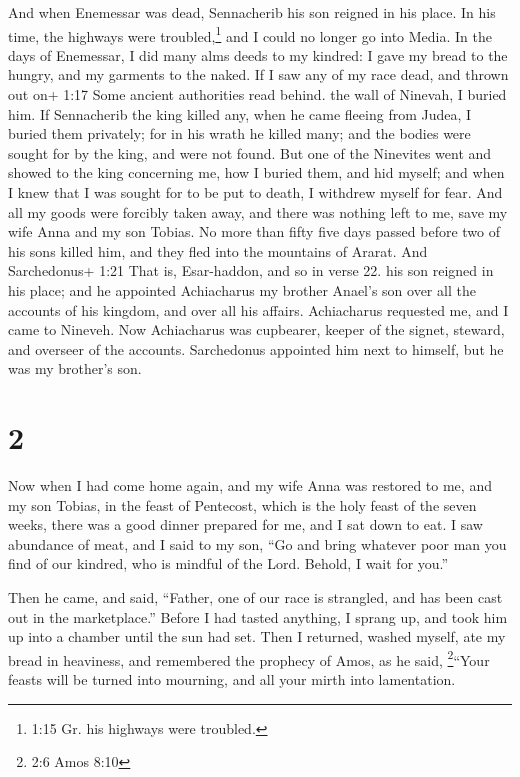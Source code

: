  And when Enemessar was dead, Sennacherib his son reigned
in his place. In his time, the highways were troubled,\footnote{1:15 Gr.
  his highways were troubled.} and I could no longer go into Media.
 In the days of Enemessar, I did many alms deeds to my
kindred: I gave my bread to the hungry,  and my garments to
the naked. If I saw any of my race dead, and thrown out on+ 1:17 Some
ancient authorities read behind. the wall of Ninevah, I buried him.
 If Sennacherib the king killed any, when he came fleeing
from Judea, I buried them privately; for in his wrath he killed many;
and the bodies were sought for by the king, and were not found.
 But one of the Ninevites went and showed to the king
concerning me, how I buried them, and hid myself; and when I knew that I
was sought for to be put to death, I withdrew myself for fear.
 And all my goods were forcibly taken away, and there was
nothing left to me, save my wife Anna and my son Tobias. 
No more than fifty five days passed before two of his sons killed him,
and they fled into the mountains of Ararat. And Sarchedonus+ 1:21 That
is, Esar-haddon, and so in verse 22. his son reigned in his place; and
he appointed Achiacharus my brother Anael's son over all the accounts of
his kingdom, and over all his affairs.  Achiacharus
requested me, and I came to Nineveh. Now Achiacharus was cupbearer,
keeper of the signet, steward, and overseer of the accounts. Sarchedonus
appointed him next to himself, but he was my brother's son.

\hypertarget{section-1}{%
\section{2}\label{section-1}}

 Now when I had come home again, and my wife Anna was
restored to me, and my son Tobias, in the feast of Pentecost, which is
the holy feast of the seven weeks, there was a good dinner prepared for
me, and I sat down to eat.  I saw abundance of meat, and I
said to my son, ``Go and bring whatever poor man you find of our
kindred, who is mindful of the Lord. Behold, I wait for you.''

 Then he came, and said, ``Father, one of our race is
strangled, and has been cast out in the marketplace.'' 
Before I had tasted anything, I sprang up, and took him up into a
chamber until the sun had set.  Then I returned, washed
myself, ate my bread in heaviness,  and remembered the
prophecy of Amos, as he said, \footnote{2:6 Amos 8:10}``Your feasts will
be turned into mourning, and all your mirth into lamentation.

